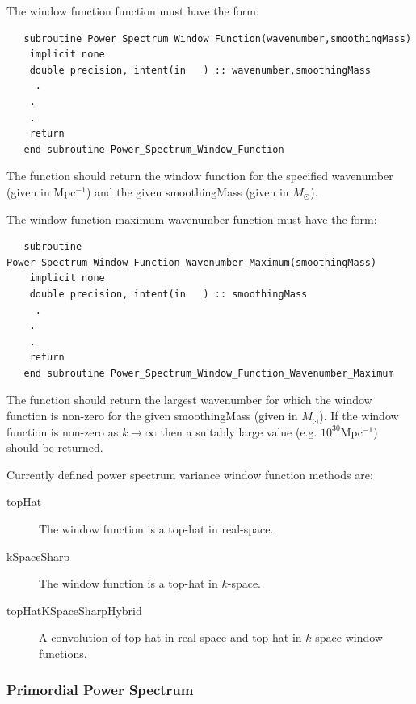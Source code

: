 The window function function must have the form:
\begin{verbatim}
   subroutine Power_Spectrum_Window_Function(wavenumber,smoothingMass)
    implicit none
    double precision, intent(in   ) :: wavenumber,smoothingMass
     .
    .
    .
    return
   end subroutine Power_Spectrum_Window_Function
\end{verbatim}
The function should return the window function for the specified {\normalfont \ttfamily wavenumber} (given in Mpc$^{-1}$) and the given {\normalfont \ttfamily smoothingMass} (given in $M_\odot$).

The window function maximum wavenumber function must have the form:
\begin{verbatim}
   subroutine Power_Spectrum_Window_Function_Wavenumber_Maximum(smoothingMass)
    implicit none
    double precision, intent(in   ) :: smoothingMass
     .
    .
    .
    return
   end subroutine Power_Spectrum_Window_Function_Wavenumber_Maximum
\end{verbatim}
The function should return the largest wavenumber for which the window function is non-zero for the given {\normalfont \ttfamily smoothingMass} (given in $M_\odot$). If the window function is non-zero as $k\rightarrow\infty$ then a suitably large value (e.g. $10^{30}$Mpc$^{-1}$) should be returned.

Currently defined power spectrum variance window function methods are:
\begin{description}
 \item [{\normalfont \ttfamily topHat}] The window function is a top-hat in real-space.
 \item [{\normalfont \ttfamily kSpaceSharp}] The window function is a top-hat in $k$-space.
 \item [{\normalfont \ttfamily topHatKSpaceSharpHybrid}] A convolution of top-hat in real space and top-hat in $k$-space window functions.
\end{description}

\subsubsection{Primordial Power Spectrum}

